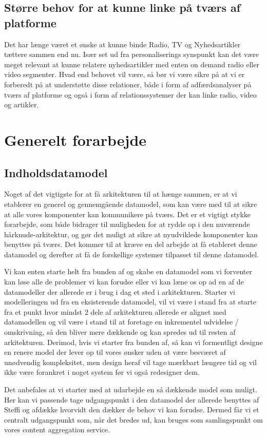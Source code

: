 \documentclass{article}
\begin{document}
\subsection{Større behov for at kunne linke på tværs af platforme}
Det har længe været et ønske at kunne binde Radio, TV og Nyhedsartikler tættere sammen end nu. Især set ud fra personaliserings synspunkt kan det være meget relevant at kunne relatere nyhedsartikler med enten on demand radio eller video segmenter.
Hvad end behovet vil være, så bør vi være sikre på at vi er forberedt på at understøtte disse relationer, både i form af adfærdsanalyser på tværs af platforme og også i form af relationssystemer der kan linke radio, video og artikler.


\section{Generelt forarbejde}
\subsection{Indholdsdatamodel}
Noget af det vigtigste for at få arkitekturen til at hænge sammen, er at vi etablerer en generel og gennemgående datamodel, som kan være med til at sikre at alle vores komponenter kan kommunikere på tværs. Det er et vigtigt stykke forarbejde, som både bidrager til muligheden for at rydde op i den nuværende hårknude-arkitektur, og gør det muligt at sikre at nyudviklede komponenter kan benyttes på tværs. Det kommer til at kræve en del arbejde at få etableret denne datamodel og derefter at få de forskellige systemer tilpasset til denne datamodel.

Vi kan enten starte helt fra bunden af og skabe en datamodel som vi forventer kan løse alle de problemer vi kan forudse eller vi kan læne os op ad en af de datamodeller der allerede er i brug i dag et sted i arkitekturen. Starter vi modelleringen ud fra en eksisterende datamodel, vil vi være i stand fra at starte fra et punkt hvor mindst 2 dele af arkitekturen allerede er alignet med datamodellen og vil være i stand til at foretage en inkrementel udvidelse / omskrivning, så den bliver mere dækkende og kan spredes ud til resten af arkitekturen. Derimod, hvis vi starter fra bunden af, så kan vi formentligt designe en renere model der lever op til vores ønsker uden at være besværet af unødvendig kompleksitet, men design heraf vil tage mærkbart længere tid og vil ikke være forankret i noget system før vi også redesigner dem.

Det anbefales at vi starter med at udarbejde en så dækkende model som muligt. Her kan vi passende tage udgangspunkt i den datamodel der allerede benyttes af Steffi og afdække hvorvidt den dækker de behov vi kan forudse. Dermed får vi et centralt udgangspunkt som, når det bredes ud, kan bruges som samlingspunkt om vores content aggregation service.  
\end{document}
